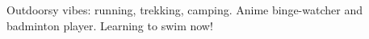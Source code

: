 


\begin{cvparagraph}
Outdoorsy vibes: running, trekking, camping. Anime binge-watcher and badminton player. Learning to swim now!
\end{cvparagraph}